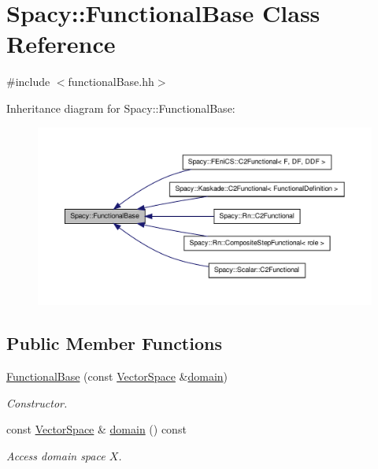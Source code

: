 \hypertarget{classSpacy_1_1FunctionalBase}{\section{\-Spacy\-:\-:\-Functional\-Base \-Class \-Reference}
\label{classSpacy_1_1FunctionalBase}
}


{\ttfamily \#include $<$functional\-Base.\-hh$>$}



\-Inheritance diagram for \-Spacy\-:\-:\-Functional\-Base\-:
\nopagebreak
\begin{figure}[H]
\begin{center}
\leavevmode
\includegraphics[width=350pt]{classSpacy_1_1FunctionalBase__inherit__graph}
\end{center}
\end{figure}
\subsection*{\-Public \-Member \-Functions}
\begin{DoxyCompactItemize}
\item 
\hyperlink{classSpacy_1_1FunctionalBase_aa655b0f2b96f02a3137dad89e3f0d2ac}{\-Functional\-Base} (const \hyperlink{classSpacy_1_1VectorSpace}{\-Vector\-Space} \&\hyperlink{classSpacy_1_1FunctionalBase_a2d3397deb9fa1ad85ed04e37a03b3aa6}{domain})
\begin{DoxyCompactList}\small\item\em \-Constructor. \end{DoxyCompactList}\item 
\hypertarget{classSpacy_1_1FunctionalBase_a2d3397deb9fa1ad85ed04e37a03b3aa6}{const \hyperlink{classSpacy_1_1VectorSpace}{\-Vector\-Space} \& \hyperlink{classSpacy_1_1FunctionalBase_a2d3397deb9fa1ad85ed04e37a03b3aa6}{domain} () const }\label{classSpacy_1_1FunctionalBase_a2d3397deb9fa1ad85ed04e37a03b3aa6}

\begin{DoxyCompactList}\small\item\em \-Access domain space $X$. \end{DoxyCompactList}\end{DoxyCompactItemize}


